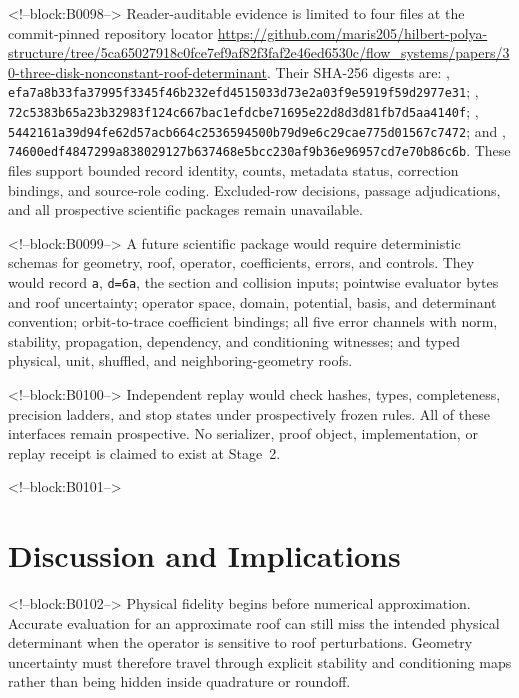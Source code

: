 \documentclass[11pt,a4paper]{article}
\begin{document}
<!--block:B0098-->
Reader-auditable evidence is limited to four files at the commit-pinned repository locator \url{https://github.com/maris205/hilbert-polya-structure/tree/5ca65027918c0fce7ef9af82f3faf2e46ed6530c/flow_systems/papers/30-three-disk-nonconstant-roof-determinant}. Their SHA-256 digests are: , \texttt{efa7a8b33fa37995f3345f46b232efd4515033d73e2a03f9e5919f59d2977e31}; , \texttt{72c5383b65a23b32983f124c667bac1efdcbe71695e22d8d3d81fb7d5aa4140f}; , \texttt{5442161a39d94fe62d57acb664c2536594500b79d9e6c29cae775d01567c7472}; and , \texttt{74600edf4847299a838029127b637468e5bcc230af9b36e96957cd7e70b86c6b}. These files support bounded record identity, counts, metadata status, correction bindings, and source-role coding. Excluded-row decisions, passage adjudications, and all prospective scientific packages remain unavailable.

<!--block:B0099-->
A future scientific package would require deterministic schemas for geometry, roof, operator, coefficients, errors, and controls. They would record \texttt{a}, \texttt{d=6a}, the section and collision inputs; pointwise evaluator bytes and roof uncertainty; operator space, domain, potential, basis, and determinant convention; orbit-to-trace coefficient bindings; all five error channels with norm, stability, propagation, dependency, and conditioning witnesses; and typed physical, unit, shuffled, and neighboring-geometry roofs.

<!--block:B0100-->
Independent replay would check hashes, types, completeness, precision ladders, and stop states under prospectively frozen rules. All of these interfaces remain prospective. No serializer, proof object, implementation, or replay receipt is claimed to exist at Stage~2.

<!--block:B0101-->
\section{Discussion and Implications}

<!--block:B0102-->
Physical fidelity begins before numerical approximation. Accurate evaluation for an approximate roof can still miss the intended physical determinant when the operator is sensitive to roof perturbations. Geometry uncertainty must therefore travel through explicit stability and conditioning maps rather than being hidden inside quadrature or roundoff.
\end{document}
